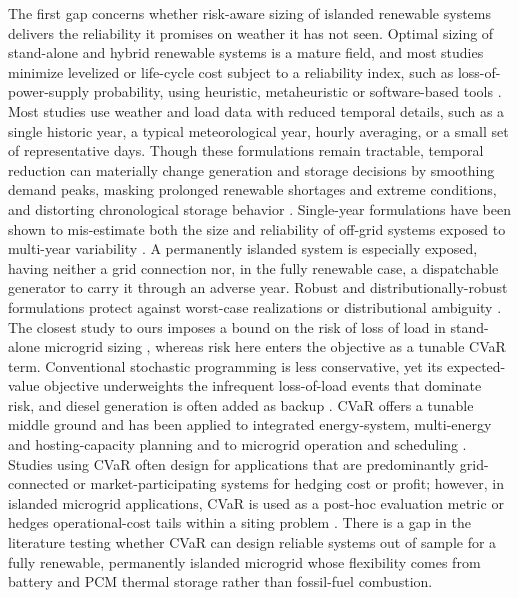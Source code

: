 \documentclass[
  journal=large,
  manuscript=article-type,
  year=2020,
  volume=37,
]{cup-journal}
\begin{document}
The first gap concerns whether risk-aware sizing of islanded renewable systems delivers the reliability it promises on weather it has not seen. Optimal sizing of stand-alone and hybrid renewable systems is a mature field, and most studies minimize levelized or life-cycle cost subject to a reliability index, such as loss-of-power-supply probability, using heuristic, metaheuristic or software-based tools \parencite{ref28,ref31}. Most studies use weather and load data with reduced temporal details, such as a single historic year, a typical meteorological year, hourly averaging, or a small set of representative days. Though these formulations remain tractable, temporal reduction can materially change generation and storage decisions by smoothing demand peaks, masking prolonged renewable shortages and extreme conditions, and distorting chronological storage behavior \parencite{ref9,ref10,ref11,ref12}. Single-year formulations have been shown to mis-estimate both the size and reliability of off-grid systems exposed to multi-year variability \parencite{ref31}. A permanently islanded system is especially exposed, having neither a grid connection nor, in the fully renewable case, a dispatchable generator to carry it through an adverse year. Robust and distributionally-robust formulations protect against worst-case realizations or distributional ambiguity \parencite{ref13,ref14}. The closest study to ours imposes a bound on the risk of loss of load in stand-alone microgrid sizing \parencite{ref24}, whereas risk here enters the objective as a tunable CVaR term. Conventional stochastic programming is less conservative, yet its expected-value objective underweights the infrequent loss-of-load events that dominate risk, and diesel generation is often added as backup \parencite{ref8}. CVaR offers a tunable middle ground and has been applied to integrated energy-system, multi-energy and hosting-capacity planning \parencite{ref15,ref16,ref17,ref25} and to microgrid operation and scheduling \parencite{ref26,ref27}. Studies using CVaR often design for applications that are predominantly grid-connected or market-participating systems for hedging cost or profit; however,  in islanded microgrid applications, CVaR is used as a post-hoc evaluation metric \parencite{ref32} or hedges operational-cost tails within a siting problem \parencite{ref33}. There is a gap in the literature testing whether CVaR can design reliable systems out of sample for a fully renewable, permanently islanded microgrid whose flexibility comes from battery and PCM thermal storage rather than fossil-fuel combustion.
\end{document}
